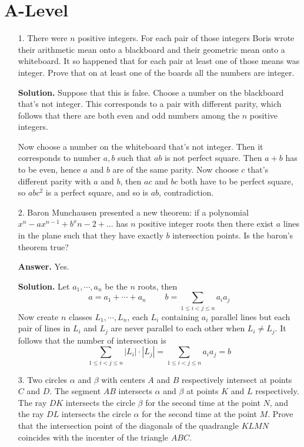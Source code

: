 \documentclass[11pt,a4paper]{article}
\begin{document}
\section*{A-Level}
\begin{enumerate}
	\item[1.]
	There were $n$ positive integers. For each pair of those integers Boris wrote their
	arithmetic mean onto a blackboard and their geometric mean onto a whiteboard. It so
	happened that for each pair at least one of those means was integer. Prove that on at
	least one of the boards all the numbers are integer.
	
	\textbf{Solution.} 
	Suppose that this is false. 
	Choose a number on the blackboard that's not integer. 
	This corresponds to a pair with different parity, 
	which follows that there are both even and odd numbers among the $n$ positive integers. 
	
	Now choose a number on the whiteboard that's not integer. 
	Then it corresponds to number $a, b$ such that $ab$ is not perfect square. 
	Then $a+b$ has to be even, hence $a$ and $b$ are of the same parity. 
	Now choose $c$ that's different parity with $a$ and $b$, 
	then $ac$ and $bc$ both have to be perfect square, 
	so $abc^2$ is a perfect square, and so is $ab$, contradiction. 
	
	\item[2.]
	Baron Munchausen presented a new theorem: if a polynomial 
	$x^n - ax^{n-1} + b^x{n-2} + \ldots$
	has $n$ positive integer roots then there exist $a$ lines in the plane such that they have
	exactly $b$ intersection points. Is the baron’s theorem true?
	
	\textbf{Answer.} Yes. 
	
	\textbf{Solution.} 
	Let $a_1, \cdots, a_n$ be the $n$ roots, then 
	\[
	a=a_1+\cdots + a_n
	\;\qquad 
	b = \sum_{1\le i < j\le n} a_ia_j
	\]
	Now create $n$ classes $L_1, \cdots, L_n$, 
	each $L_i$ containing $a_i$ parallel lines but each pair of lines in $L_i$ and $L_j$ are never parallel to each other when $L_i\neq L_j$. 
	It follows that the number of intersection is 
	\[
	\sum_{1\le i<j\le n}|L_i|\cdot |L_j|
	=\sum_{1\le i < j\le n} a_ia_j=b
	\]
	
	\item[3.]
	Two circles $\alpha$ and $\beta$ with centers $A$ and $B$ respectively intersect at points $C$ and $D$. The segment $AB$ intersects $\alpha$ and $\beta$ at points $K$ and $L$ respectively. 
	The ray $DK$ intersects the circle $\beta$ for the second time at the point $N$, 
	and the ray $DL$ intersects the circle $\alpha$ for the second time at the point $M$. 
	Prove that the intersection point of the diagonals of the quadrangle $KLMN$ coincides with the incenter of the triangle $ABC$.
	

\end{enumerate}
\end{document}
